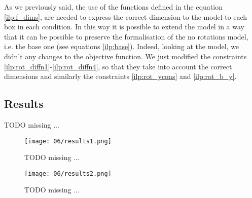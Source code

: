     As we previously said, the use of the functions defined in the equation \ref{ilp:f_dims}, are 
    needed to express the correct dimension to the model to each box in each condition. In this way 
    it is possible to extend the model in a way that it can be possible to preserve the 
    formalisation of the no rotations model, i.e. the base one (see equations \ref{ilp:base}).
    Indeed, looking at the model, we didn't any changes to the objective function. We just modified
    the constraints \ref{ilp:rot_diffn1}-\ref{ilp:rot_diffn4}, so that they take into account the 
    correct dimensions and similarly the constraints \ref{ilp:rot_ycons} and \ref{ilp:rot_b_y}.



\subsection{Results}
    \colorbox{BurntOrange}{TODO missing ...} \\

    \begin{figure}[H]
      \centering
      \texttt{[image: 06/results1.png]}
      \caption{
        \colorbox{BurntOrange}{TODO missing ...}
      }
      \label{fig:ILP_results1}
    \end{figure}
    \begin{figure}[H]
      \centering
      \texttt{[image: 06/results2.png]}
      \caption{
        \colorbox{BurntOrange}{TODO missing ...}
      }
      \label{fig:ILP_results2}
    \end{figure}
